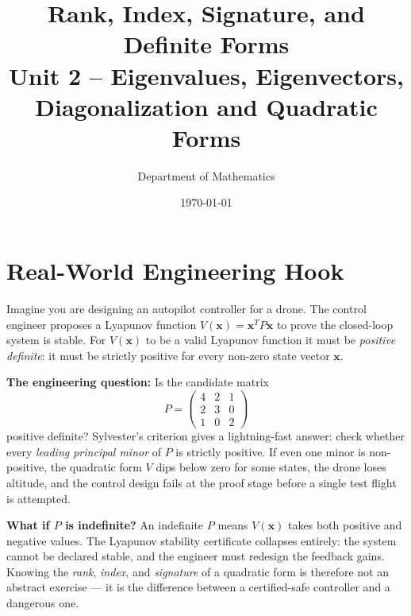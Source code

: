 \documentclass[12pt,a4paper]{article}
\title{\textbf{Rank, Index, Signature, and Definite Forms} \\ \large Unit 2 -- Eigenvalues, Eigenvectors, Diagonalization and Quadratic Forms}
\author{Department of Mathematics}
\date{\today}
\begin{document}
\maketitle
\tableofcontents
\newpage

\section{Real-World Engineering Hook}

\begin{curiositybox}
Imagine you are designing an autopilot controller for a drone. The control engineer proposes
a Lyapunov function \(V(\mathbf{x}) = \mathbf{x}^{T} P \mathbf{x}\) to prove the closed-loop
system is stable. For \(V(\mathbf{x})\) to be a valid Lyapunov function it must be
\emph{positive definite}: it must be strictly positive for every non-zero state vector
\(\mathbf{x}\).

\medskip
\noindent\textbf{The engineering question:} Is the candidate matrix
\[
P = \begin{pmatrix} 4 & 2 & 1 \\ 2 & 3 & 0 \\ 1 & 0 & 2 \end{pmatrix}
\]
positive definite? Sylvester's criterion gives a lightning-fast answer: check whether
every \emph{leading principal minor} of \(P\) is strictly positive. If even one minor
is non-positive, the quadratic form \(V\) dips below zero for some states, the drone
loses altitude, and the control design fails at the proof stage before a single test
flight is attempted.

\medskip
\noindent\textbf{What if \(P\) is indefinite?} An indefinite \(P\) means \(V(\mathbf{x})\)
takes both positive and negative values. The Lyapunov stability certificate collapses entirely:
the system cannot be declared stable, and the engineer must redesign the feedback gains.
Knowing the \emph{rank}, \emph{index}, and \emph{signature} of a quadratic form is therefore
not an abstract exercise --- it is the difference between a certified-safe controller and a
dangerous one.
\end{curiositybox}

\end{document}
